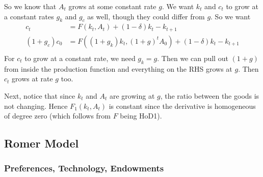 \documentclass[12pt]{article}
\theoremstyle{plain}
\theoremstyle{definition}
\theoremstyle{remark}
\begin{document}
So we know that $A_t$ grows at some constant rate $g$. We want $k_t$ and
$c_t$ to grow at a constant rates $g_k$ and $g_c$ as well, though they
could differ from $g$. So we want
\begin{align*}
  c_t &= F(k_t,A_t) + (1-\delta) k_t - k_{t+1} \\
  (1+g_c) c_0 &= F((1+g_k)k_t,(1+g)^tA_0) + (1-\delta) k_t - k_{t+1} \\
\end{align*}
For $c_t$ to grow at a constant rate, we need $g_k=g$. Then we can pull
out $(1+g)$ from inside the production function and everything on the
RHS grows at $g$. Then $c_t$ grows at rate $g$ too.

Next, notice that since $k_t$ and $A_t$ are growing at $g$, the ratio
between the goods is not changing. Hence $F_1(k_t,A_t)$ is constant
since the derivative is homogeneous of degree zero (which follows from
$F$ being HoD1).


\clearpage
\subsection{Romer Model}

\subsubsection{Preferences, Technology, Endowments}
\end{document}
